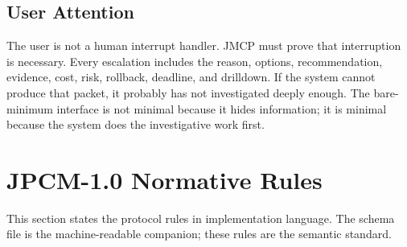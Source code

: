 \documentclass[journal,onecolumn]{IEEEtran}
\begin{document}
\subsection{User Attention}
The user is not a human interrupt handler. JMCP must prove that interruption is necessary. Every escalation includes the reason, options, recommendation, evidence, cost, risk, rollback, deadline, and drilldown. If the system cannot produce that packet, it probably has not investigated deeply enough. The bare-minimum interface is not minimal because it hides information; it is minimal because the system does the investigative work first.

\section{JPCM-1.0 Normative Rules}
This section states the protocol rules in implementation language. The schema file is the machine-readable companion; these rules are the semantic standard.
\end{document}
